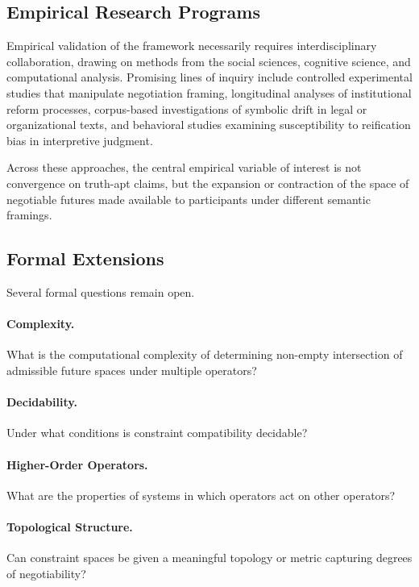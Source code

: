 \documentclass[11pt]{article}
\begin{document}
\subsection{Empirical Research Programs}

Empirical validation of the framework necessarily requires interdisciplinary
collaboration, drawing on methods from the social sciences, cognitive science,
and computational analysis. Promising lines of inquiry include controlled
experimental studies that manipulate negotiation framing, longitudinal analyses
of institutional reform processes, corpus-based investigations of symbolic drift
in legal or organizational texts, and behavioral studies examining susceptibility
to reification bias in interpretive judgment.

Across these approaches, the central empirical variable of interest is not
convergence on truth-apt claims, but the expansion or contraction of the space of
negotiable futures made available to participants under different semantic
framings.

\subsection{Formal Extensions}

Several formal questions remain open.

\paragraph{Complexity.}
What is the computational complexity of determining non-empty intersection of
admissible future spaces under multiple operators?

\paragraph{Decidability.}
Under what conditions is constraint compatibility decidable?

\paragraph{Higher-Order Operators.}
What are the properties of systems in which operators act on other operators?

\paragraph{Topological Structure.}
Can constraint spaces be given a meaningful topology or metric capturing degrees
of negotiability?
\end{document}
